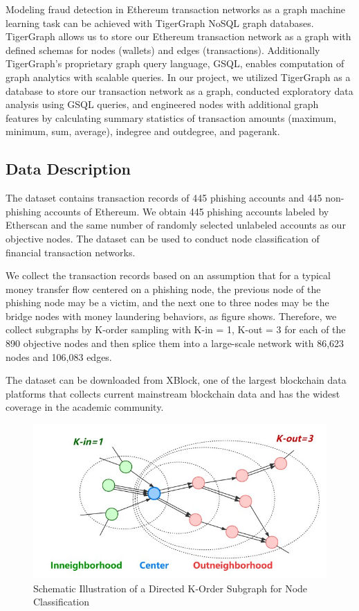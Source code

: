 \documentclass{article}
\begin{document}
Modeling fraud detection in Ethereum transaction networks as a graph machine learning task can be achieved with TigerGraph NoSQL graph databases. TigerGraph allows us to store our Ethereum transaction network as a graph with defined schemas for nodes (wallets) and edges (transactions). Additionally TigerGraph’s proprietary graph query language, GSQL, enables computation of graph analytics with scalable queries. In our project, we utilized TigerGraph as a database to store our transaction network as a graph, conducted exploratory data analysis using GSQL queries, and engineered nodes with additional graph features by calculating summary statistics of transaction amounts (maximum, minimum, sum, average), indegree and outdegree, and pagerank.

\subsection{Data Description}
The dataset contains transaction records of 445 phishing accounts and 445 non-phishing accounts of Ethereum. We obtain 445 phishing accounts labeled by Etherscan and the same number of randomly selected unlabeled accounts as our objective nodes. The dataset can be used to conduct node classification of financial transaction networks.

We collect the transaction records based on an assumption that for a typical money transfer flow centered on a phishing node, the previous node of the phishing node may be a victim, and the next one to three nodes may be the bridge nodes with money laundering behaviors, as figure shows. Therefore, we collect subgraphs by K-order sampling with K-in = 1, K-out = 3 for each of the 890 objective nodes and then splice them into a large-scale network with 86,623 nodes and 106,083 edges.

The dataset can be downloaded from XBlock, one of the largest blockchain data platforms that collects current mainstream blockchain data and has the widest coverage in the academic community.

\begin{figure}[h]
	\centering
	\includegraphics[width=0.85\linewidth]{images/GCZGmd.md.jpg}
	\caption{Schematic Illustration of a Directed K-Order Subgraph for Node Classification}
\end{figure}
\end{document}
